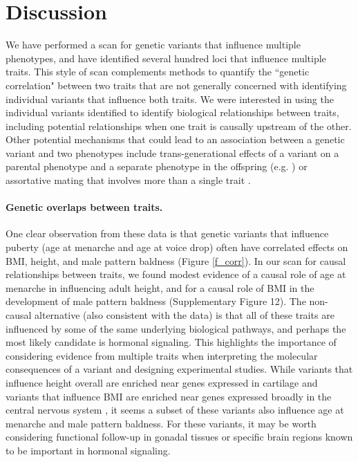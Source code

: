 \documentclass[11pt,titlepage]{article}
\begin{document}

\section{Discussion}
We have performed a scan for genetic variants that influence multiple phenotypes, and have identified several hundred loci that influence multiple traits. This style of scan complements methods to quantify the ``genetic correlation" between two traits \citep{Lee:2012aa,Visscher:2014aa, bulik2015atlas, Loh:2015aa} that are not generally concerned with identifying individual variants that influence both traits. We were interested in using the individual variants identified to identify biological relationships between traits, including potential relationships when one trait is causally upstream of the other. Other potential mechanisms that could lead to an association between a genetic variant and two phenotypes include trans-generational effects of a variant on a parental phenotype and a separate phenotype in the offspring (e.g. \citet{Ueland:2001aa}) or assortative mating that involves more than a single trait \citep{Gianola:1982aa}.

\paragraph{Genetic overlaps between traits.}
One clear observation from these data is that genetic variants that influence puberty (age at menarche and age at voice drop) often have correlated effects on BMI, height, and male pattern baldness (Figure \ref{f_corr}). 
In our scan for causal relationships between traits, we found modest evidence of a causal role of age at menarche in influencing adult height, and for a causal role of BMI in the development of male pattern baldness (Supplementary Figure 12). 
The non-causal alternative (also consistent with the data) is that all of these traits are influenced by some of the same underlying biological pathways, and perhaps the most likely candidate is hormonal signaling. 
This highlights the importance of considering evidence from multiple traits when interpreting the molecular consequences of a variant and designing experimental studies. 
While variants that influence height overall are enriched near genes expressed in cartilage \citep{Wood:2014aa} and variants that influence BMI are enriched near genes expressed broadly in the central nervous system \citep{Locke:2015aa}, it seems a subset of these variants also influence age at menarche and male pattern baldness. 
For these variants, it may be worth considering functional follow-up in gonadal tissues or specific brain regions known to be important in hormonal signaling.
\end{document}
